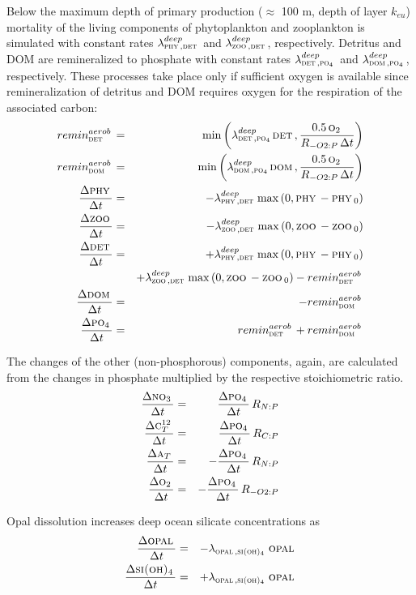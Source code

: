 \documentclass[11pt,a4paper,fleqn,twoside]{article}
\def\pho{\text{\textsc{po$_4$}}\,}
\def\nit{\text{\textsc{no$_3$}}\,}
\def\car{\text{\textsc{c$_T^{12}$}}\,}
\def\oxy{\text{\textsc{o$_2$}}\,}
\def\alk{\text{\textsc{a$_T$}}\,}
\def\sio{\text{\textsc{si(oh)$_4$}}\,}
\def\dom{\text{\textsc{dom}}\,}
\def\phy{\text{\textsc{phy}}\,}
\def\zoo{\text{\textsc{zoo}}\,}
\def\det{\text{\textsc{det}}\,}
\def\opal{\text{\textsc{opal}}\,}
\begin{document}
Below the maximum depth of primary production ($\approx$ 100 m, depth of layer $k_{eu}$) 
mortality of the living components of phytoplankton and zooplankton is simulated with constant rates
$\lambda_{\phy,\det}^{deep}$ and $\lambda_{\zoo,\det}^{deep}$, respectively. Detritus and DOM
are remineralized to phosphate with constant rates $\lambda_{\det,\pho}^{deep}$ and
$\lambda_{\dom,\pho}^{deep}$, respectively. These
processes take place only if sufficient oxygen is available
since remineralization of detritus and DOM
requires oxygen for the respiration of the associated carbon:
\begin{eqnarray}
remin^{aerob}_\det& = & \min\left(\lambda_{\det,\pho}^{deep} \det
, \frac{0.5\,\oxy}{R_{-O2:P}\,\Delta t}  \right) \nonumber \\
remin^{aerob}_\dom& = &  \min\left(\lambda_{\dom,\pho}^{deep} \dom
, \frac{0.5\,\oxy}{R_{-O2:P}\,\Delta t}  \right) \nonumber \\
\frac{\Delta \phy}{\Delta t} & = & -\lambda_{\phy,\det}^{deep} \max\left(0, \phy - \phy_0 \right)\\
\frac{\Delta \zoo}{\Delta t} & = & -\lambda_{\zoo,\det}^{deep} \max\left(0, \zoo - \zoo_0 \right)\\
\label{eq_det_aerob}\frac{\Delta \det}{\Delta t} & = & 
+ \lambda_{\phy,\det}^{deep} \max\left(0, \phy - \phy_0 \right)\\ \nonumber
& &+ \lambda_{\zoo,\det}^{deep} \max\left(0, \zoo - \zoo_0 \right) 
- remin^{aerob}_\det\\
\frac{\Delta \dom}{\Delta t} & = & - remin^{aerob}_\dom\\
\frac{\Delta \pho}{\Delta t} & = & remin^{aerob}_\det + remin^{aerob}_\dom
\end{eqnarray}

The changes of the other (non-phosphorous) components, again, are calculated from
the changes in phosphate multiplied by the respective stoichiometric ratio. 
\begin{eqnarray}
\frac{\Delta \nit}{\Delta t} & = & \frac{\Delta \pho}{\Delta t} \, R_{N:P}\\
\frac{\Delta \car}{\Delta t} & = & \frac{\Delta \pho}{\Delta t} \, R_{C:P}\\
\frac{\Delta \alk}{\Delta t} & = & - \frac{\Delta \pho}{\Delta t} \, R_{N:P}\\
\frac{\Delta \oxy}{\Delta t} & = & - \frac{\Delta \pho}{\Delta t} \, R_{-O2:P}
\end{eqnarray}

Opal dissolution increases deep ocean silicate concentrations as
\begin{eqnarray}
\frac{\Delta \opal}{\Delta  t} & = & -\lambda_{\opal,\sio} \, \opal\\
\frac{\Delta \sio}{\Delta  t} & = & +\lambda_{\opal,\sio} \, \opal
\end{eqnarray}
\end{document}
